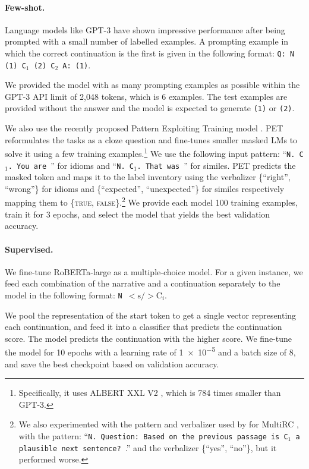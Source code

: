 \paragraph{Few-shot.} Language models like GPT-3 have shown impressive performance after being prompted with a small number of labelled examples. A prompting example in which the correct continuation is the first is given in the following format: \texttt{Q: N (1) C$_1$ (2) C$_2$ A: (1)}.


We provided the model with as many prompting examples as possible within the GPT-3 API limit of 2,048 tokens, which is 6 examples. The test examples are provided without the answer and the model is expected to generate \texttt{(1)} or \texttt{(2)}. 

We also use the recently proposed Pattern Exploiting Training model \cite[PET;][]{schick-schutze-2021-just}. PET reformulates the tasks as a cloze question and fine-tunes smaller masked LMs to solve it using a few training examples.\footnote{Specifically, it uses ALBERT XXL V2 \cite{lan2019albert}, which is 784 times smaller than GPT-3.} We use the following input pattern: ``\texttt{N. C$_1$. You are \textunderscore}'' for idioms and ``\texttt{N. C$_1$. That was \textunderscore}'' for similes. PET predicts the masked token and maps it to the label inventory using the verbalizer \{``right'', ``wrong''\} for idioms and \{``expected'', ``unexpected''\} for similes respectively mapping  them to \{\textsc{true}, \textsc{false}\}.\footnote{ We also experimented with the pattern and verbalizer used by  for MultiRC \cite{khashabi-etal-2018-looking}, with the pattern: ``\texttt{N. Question: Based on the previous passage is C$_1$ a plausible next sentence? \textunderscore}.'' and the verbalizer \{``yes'', ``no''\}, but it performed worse.} We provide each model 100 training examples, train it for 3 epochs, and select the model that yields the best validation accuracy.

\paragraph{Supervised.} We fine-tune RoBERTa-large \cite{liu2019roberta} as a multiple-choice model. For a given instance, we feed each combination of the narrative and a continuation separately to the model in the following format: \texttt{N $\lt\text{s/}\gt\text{C}_i$}. 

We pool the representation of the start token to get a single vector representing each continuation, and feed it into a classifier that predicts the continuation score. The model predicts the continuation with the higher score. We fine-tune the model for 10 epochs with a learning rate of \num{1e-5}  and a batch size of 8, and save the best checkpoint based on validation accuracy.

